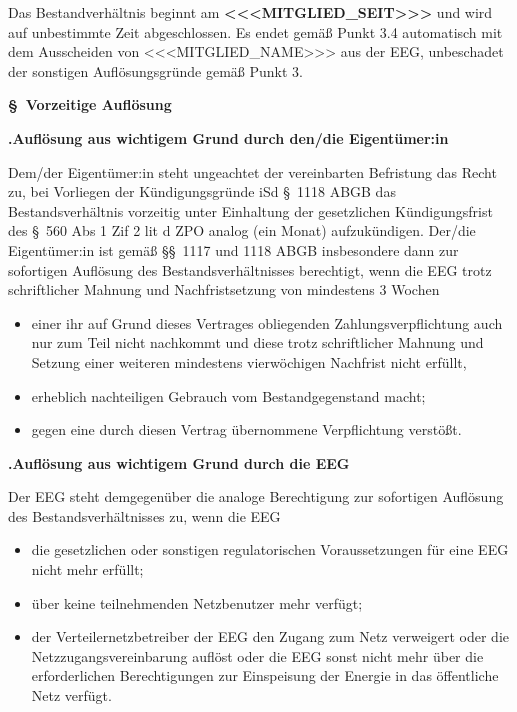 \documentclass[a4paper,11pt]{article}
\newcounter{parasec}
\newcounter{parasubsec}[parasec]
\newcommand{\parasec}[1]{%
  \stepcounter{parasec}%
  \setcounter{parasubsec}{0}%
  \par\Needspace*{5\baselineskip}%
  \bigskip
  {\large\bfseries\color{tuerkis}\S\ \theparasec\quad #1}\par\nopagebreak
  \smallskip\nopagebreak
}
\newcommand{\parasubsec}[1]{%
  \stepcounter{parasubsec}%
  \par\Needspace*{4\baselineskip}%
  \medskip
  {\bfseries\color{tuerkis}\theparasec.\theparasubsec\quad #1}\par\nopagebreak
  \smallskip\nopagebreak
}
\begin{document}
Das Bestandverhältnis beginnt am \textbf{<<<MITGLIED_SEIT>>>} und wird auf unbestimmte Zeit abgeschlossen. Es endet gemäß Punkt 3.4 automatisch mit dem Ausscheiden von <<<MITGLIED_NAME>>> aus der EEG, unbeschadet der sonstigen Auflösungsgründe gemäß Punkt 3.

\parasec{Vorzeitige Auflösung}

\parasubsec{Auflösung aus wichtigem Grund durch den/die Eigentümer:in}

Dem/der Eigentümer:in steht ungeachtet der vereinbarten Befristung das Recht zu, bei Vorliegen der Kündigungsgründe iSd \S\ 1118 ABGB das Bestandsverhältnis vorzeitig unter Einhaltung der gesetzlichen Kündigungsfrist des \S\ 560 Abs 1 Zif 2 lit d ZPO analog (ein Monat) aufzukündigen. Der/die Eigentümer:in ist gemäß \S\S\ 1117 und 1118 ABGB insbesondere dann zur sofortigen Auflösung des Bestandsverhältnisses berechtigt, wenn die EEG trotz schriftlicher Mahnung und Nachfristsetzung von mindestens 3 Wochen

\begin{itemize}
  \item einer ihr auf Grund dieses Vertrages obliegenden Zahlungsverpflichtung auch nur zum Teil nicht nachkommt und diese trotz schriftlicher Mahnung und Setzung einer weiteren mindestens vierwöchigen Nachfrist nicht erfüllt,
  \item erheblich nachteiligen Gebrauch vom Bestandgegenstand macht;
  \item gegen eine durch diesen Vertrag übernommene Verpflichtung verstößt.
\end{itemize}

\parasubsec{Auflösung aus wichtigem Grund durch die EEG}

Der EEG steht demgegenüber die analoge Berechtigung zur sofortigen Auflösung des Bestandsverhältnisses zu, wenn die EEG

\begin{itemize}
  \item die gesetzlichen oder sonstigen regulatorischen Voraussetzungen für eine EEG nicht mehr erfüllt;
  \item über keine teilnehmenden Netzbenutzer mehr verfügt;
  \item der Verteilernetzbetreiber der EEG den Zugang zum Netz verweigert oder die Netzzugangsvereinbarung auflöst oder die EEG sonst nicht mehr über die erforderlichen Berechtigungen zur Einspeisung der Energie in das öffentliche Netz verfügt.
\end{itemize}
\end{document}
